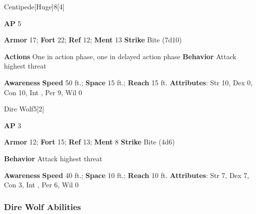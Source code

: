 \begin{monsection}{Centipede}[Huge]{8}[4]
\vspace{-1em}\vspace{-1em}
\begin{spellcontent}
\begin{spelltargetinginfo}
{\textbf{AP} 5}

\pari \textbf{Armor} 17;
\textbf{Fort} 22;
\textbf{Ref} 12;
\textbf{Ment} 13
\pari \textbf{Strike} Bite  (7d10)


\pari \textbf{Actions} One in action phase, one in delayed action phase
\pari \textbf{Behavior} Attack highest threat
\end{spelltargetinginfo}
\end{spellcontent}

\begin{monsterfooter}
\pari \textbf{Awareness} 
\pari \textbf{Speed} 50 ft.;
\textbf{Space} 15 ft.;
\textbf{Reach} 15 ft.
\pari \textbf{Attributes}:
Str 10,
Dex 0,
Con 10,
Int ,
Per 9,
Wil 0
\end{monsterfooter}
\end{monsection}

\begin{monsection}{Dire Wolf}{5}[2]
\vspace{-1em}\vspace{-1em}
\begin{spellcontent}
\begin{spelltargetinginfo}
{\textbf{AP} 3}

\pari \textbf{Armor} 12;
\textbf{Fort} 15;
\textbf{Ref} 13;
\textbf{Ment} 8
\pari \textbf{Strike} Bite  (4d6)



\pari \textbf{Behavior} Attack highest threat
\end{spelltargetinginfo}
\end{spellcontent}

\begin{monsterfooter}
\pari \textbf{Awareness} 
\pari \textbf{Speed} 40 ft.;
\textbf{Space} 10 ft.;
\textbf{Reach} 10 ft.
\pari \textbf{Attributes}:
Str 7,
Dex 7,
Con 3,
Int ,
Per 6,
Wil 0
\end{monsterfooter}
\end{monsection}


\subsubsection{Dire Wolf Abilities}

